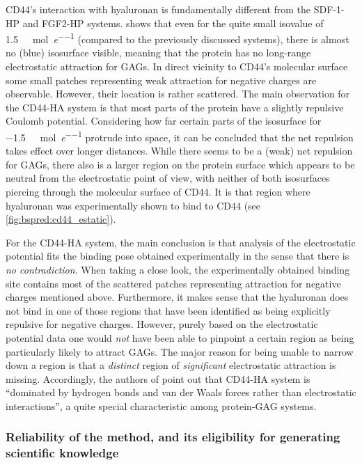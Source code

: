 CD44's interaction with hyaluronan is fundamentally different from the SDF-1-HP
and FGF2-HP systems.  shows that even for the
quite small isovalue of \SI{1.5}{\kilo\calory\per\mole\per\elementarycharge}
(compared to the previously discussed systems), there is almost no (blue)
isosurface visible, meaning that the protein has no long-range electrostatic
attraction for GAGs. In direct vicinity to CD44's molecular surface some small
patches representing weak attraction for negative charges are observable.
However, their location is rather scattered. The main observation for the
CD44-HA system is that most parts of the protein have a slightly repulsive
Coulomb potential. Considering how far certain parts of the isosurface for
\SI{-1.5}{\kilo\calory\per\mole\per\elementarycharge} protrude into space, it
can be concluded that the net repulsion takes effect over longer distances.
While there seems to be a (weak) net repulsion for GAGs, there also is a larger
region on the protein surface which appears to be neutral from the electrostatic
point of view, with neither of both isosurfaces piercing through the molecular
surface of CD44. It is that region where hyaluronan was experimentally shown to
bind to CD44 (see
\cref{fig:bspred:cd44_estatic}).

For the CD44-HA system, the main conclusion is that analysis of the
electrostatic potential fits the binding pose obtained experimentally in the
sense that there is \textit{no contradiction}. When taking a close look, the
experimentally obtained binding site contains most of the scattered patches
representing attraction for negative charges mentioned above. Furthermore, it
makes sense that the hyaluronan does not bind in one of those regions that have
been identified as being explicitly repulsive for negative charges. However,
purely based on the electrostatic potential data one would \textit{not} have
been able to pinpoint a certain region as being particularly likely to attract
GAGs. The major reason for being unable to narrow down a region is that a
\textit{distinct} region of \textit{significant} electrostatic attraction is
missing. Accordingly, the authors of \cite{cd44_hya_2007} point out that CD44-HA
system is \enquote{dominated by hydrogen bonds and van der Waals forces rather
than electrostatic interactions}, a quite special characteristic among
protein-GAG systems.


\subsubsection{Reliability of the method, and its
eligibility for generating scientific knowledge}

